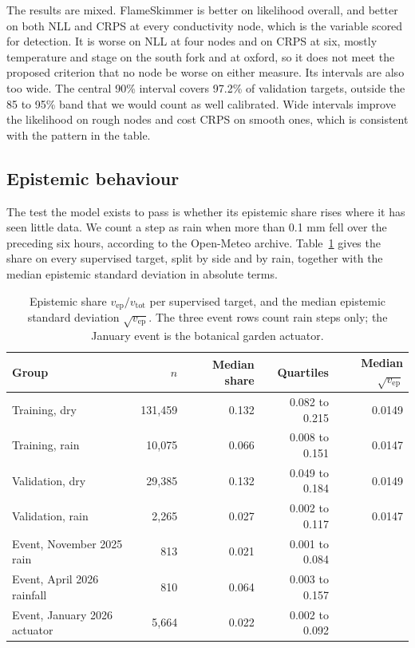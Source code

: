 \documentclass{article}
\begin{document}
The results are mixed. FlameSkimmer is better on likelihood overall, and better
on both NLL and CRPS at every conductivity node, which is the variable scored
for detection. It is worse on NLL at four nodes and on CRPS at six, mostly
temperature and stage on the south fork and at oxford, so it does not meet the
proposed criterion that no node be worse on either measure. Its intervals are
also too wide. The central 90\% interval covers 97.2\% of validation targets,
outside the 85 to 95\% band that we would count as well calibrated. Wide
intervals improve the likelihood on rough nodes and cost CRPS on smooth ones,
which is consistent with the pattern in the table.

\subsection{Epistemic behaviour}
\label{sec:epistemic}

The test the model exists to pass is whether its epistemic share rises where it
has seen little data. We count a step as rain when more than 0.1 mm fell over
the preceding six hours, according to the Open-Meteo archive.
Table~\ref{tab:epistemic} gives the share on every supervised target, split by
side and by rain, together with the median epistemic standard deviation in
absolute terms.

\begin{table}[t]
  \centering
  \caption{Epistemic share $v_{\mathrm{ep}} / v_{\mathrm{tot}}$ per supervised
    target, and the median epistemic standard deviation
    $\sqrt{v_{\mathrm{ep}}}$. The three event rows count rain steps only; the
    January event is the botanical garden actuator.}
  \label{tab:epistemic}
  \begin{tabular}{lrrrr}
    \toprule
    Group & $n$ & Median share & Quartiles & Median $\sqrt{v_{\mathrm{ep}}}$ \\
    \midrule
    Training, dry      & 131{,}459 & 0.132 & 0.082 to 0.215 & 0.0149 \\
    Training, rain     &  10{,}075 & 0.066 & 0.008 to 0.151 & 0.0147 \\
    Validation, dry    &  29{,}385 & 0.132 & 0.049 to 0.184 & 0.0149 \\
    Validation, rain   &   2{,}265 & 0.027 & 0.002 to 0.117 & 0.0147 \\
    \midrule
    Event, November 2025 rain & 813 & 0.021 & 0.001 to 0.084 & \\
    Event, April 2026 rainfall & 810 & 0.064 & 0.003 to 0.157 & \\
    Event, January 2026 actuator & 5{,}664 & 0.022 & 0.002 to 0.092 & \\
    \bottomrule
  \end{tabular}
\end{table}
\end{document}
